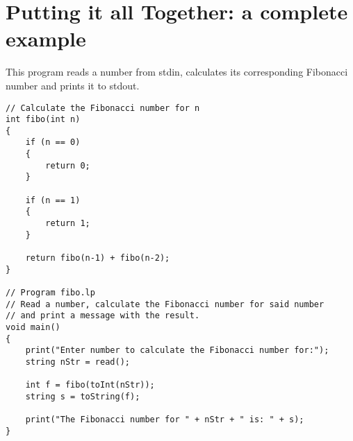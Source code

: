 \documentclass[11pt, a4paper]{article}
\begin{document}
\newpage
\section{Putting it all Together: a complete example}

This program reads a number from stdin, calculates its corresponding Fibonacci number and prints it to stdout.

\begin{verbatim}
// Calculate the Fibonacci number for n
int fibo(int n)
{
    if (n == 0)
    {
        return 0;
    }

    if (n == 1)
    {
        return 1;
    }

    return fibo(n-1) + fibo(n-2);
}

// Program fibo.lp
// Read a number, calculate the Fibonacci number for said number
// and print a message with the result.
void main()
{
    print("Enter number to calculate the Fibonacci number for:");
    string nStr = read();

    int f = fibo(toInt(nStr));
    string s = toString(f);

    print("The Fibonacci number for " + nStr + " is: " + s);
}
\end{verbatim}
\end{document}
